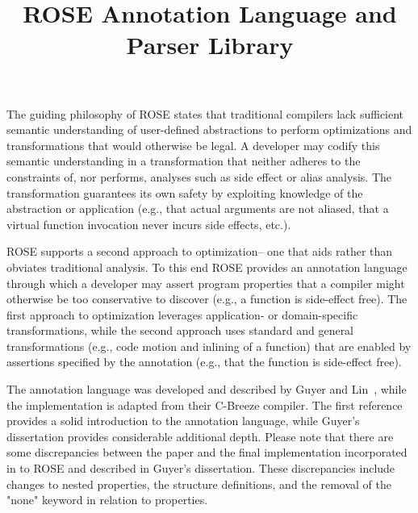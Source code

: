 \documentclass[times, 10pt]{article}
\title{ROSE Annotation Language and Parser Library}
\begin{document}
\date{}

\maketitle


The guiding philosophy of ROSE states that traditional compilers lack
sufficient semantic understanding of user-defined abstractions to perform
optimizations and transformations that would otherwise be legal.  A 
developer may codify this semantic understanding in a transformation that
neither adheres to the constraints of, nor performs, analyses such as side
effect or alias analysis.  The transformation guarantees its own safety
by exploiting knowledge of the abstraction or application (e.g., that
actual arguments are not aliased, that a virtual function invocation never
incurs side effects, etc.).

ROSE supports a second approach to optimization-- one that aids rather
than obviates traditional analysis.  To this end ROSE provides an
annotation language through which a developer may assert program
properties that a compiler might otherwise be too conservative to 
discover (e.g., a function is side-effect free).  The first approach to
optimization leverages application- or domain-specific transformations,
while the second approach uses standard and general transformations
(e.g., code motion and inlining of a function) that are enabled by
assertions specified by the annotation (e.g., that the function is side-effect
free).

The annotation language was developed and described by Guyer and Lin~\cite{guyer+:dsl99, guyer03},
while the implementation is adapted from their C-Breeze compiler.  The
first reference provides a solid introduction to the annotation language,
while Guyer's dissertation provides considerable additional depth.  Please
note that there are some discrepancies between the paper and the final
implementation incorporated in to ROSE and described in Guyer's
dissertation.  These discrepancies include changes to nested properties, the
structure definitions, and the removal of the "none" keyword in relation to 
properties.

\end{document}
